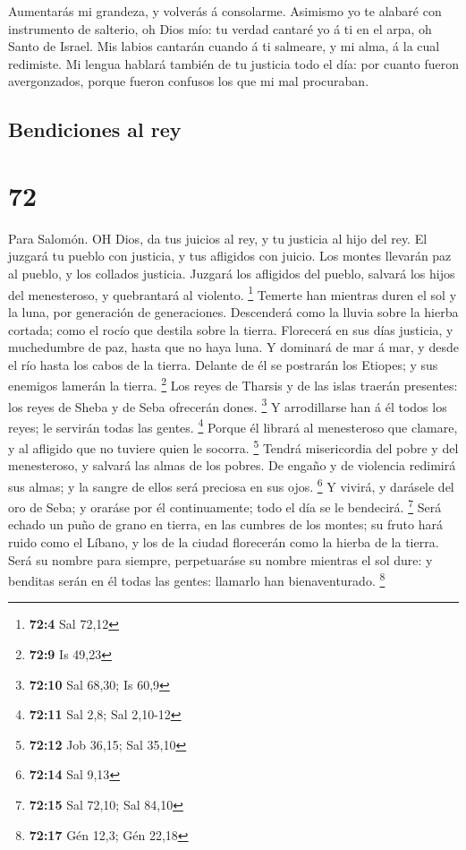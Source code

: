  Aumentarás mi grandeza, y volverás á consolarme.
 Asimismo yo te alabaré con instrumento de salterio, oh
Dios mío: tu verdad cantaré yo á ti en el arpa, oh Santo de Israel.
 Mis labios cantarán cuando á ti salmeare, y mi alma, á la
cual redimiste.  Mi lengua hablará también de tu justicia
todo el día: por cuanto fueron avergonzados, porque fueron confusos los
que mi mal procuraban.

\hypertarget{bendiciones-al-rey}{%
\subsection{Bendiciones al rey}\label{bendiciones-al-rey}}

\hypertarget{section-71}{%
\section{72}\label{section-71}}

 Para Salomón. OH Dios, da tus juicios al rey, y tu justicia
al hijo del rey.  El juzgará tu pueblo con justicia, y tus
afligidos con juicio.  Los montes llevarán paz al pueblo, y
los collados justicia.  Juzgará los afligidos del pueblo,
salvará los hijos del menesteroso, y quebrantará al violento.
\footnote{\textbf{72:4} Sal 72,12}  Temerte han mientras
duren el sol y la luna, por generación de generaciones. 
Descenderá como la lluvia sobre la hierba cortada; como el rocío que
destila sobre la tierra.  Florecerá en sus días justicia, y
muchedumbre de paz, hasta que no haya luna.  Y dominará de
mar á mar, y desde el río hasta los cabos de la tierra. 
Delante de él se postrarán los Etiopes; y sus enemigos lamerán la
tierra. \footnote{\textbf{72:9} Is 49,23}  Los reyes de
Tharsis y de las islas traerán presentes: los reyes de Sheba y de Seba
ofrecerán dones. \footnote{\textbf{72:10} Sal 68,30; Is 60,9}
 Y arrodillarse han á él todos los reyes; le servirán todas
las gentes. \footnote{\textbf{72:11} Sal 2,8; Sal 2,10-12} 
Porque él librará al menesteroso que clamare, y al afligido que no
tuviere quien le socorra. \footnote{\textbf{72:12} Job 36,15; Sal 35,10}
 Tendrá misericordia del pobre y del menesteroso, y salvará
las almas de los pobres.  De engaño y de violencia redimirá
sus almas; y la sangre de ellos será preciosa en sus ojos. \footnote{\textbf{72:14}
  Sal 9,13}  Y vivirá, y darásele del oro de Seba; y
oraráse por él continuamente; todo el día se le bendecirá. \footnote{\textbf{72:15}
  Sal 72,10; Sal 84,10}  Será echado un puño de grano en
tierra, en las cumbres de los montes; su fruto hará ruido como el
Líbano, y los de la ciudad florecerán como la hierba de la tierra.
 Será su nombre para siempre, perpetuaráse su nombre
mientras el sol dure: y benditas serán en él todas las gentes: llamarlo
han bienaventurado. \footnote{\textbf{72:17} Gén 12,3; Gén 22,18}

